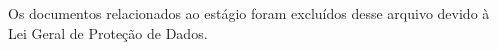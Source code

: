 \begin{epigrafe}
	Os documentos relacionados ao estágio foram excluídos desse arquivo devido à Lei Geral de Proteção de Dados.
\end{epigrafe}



